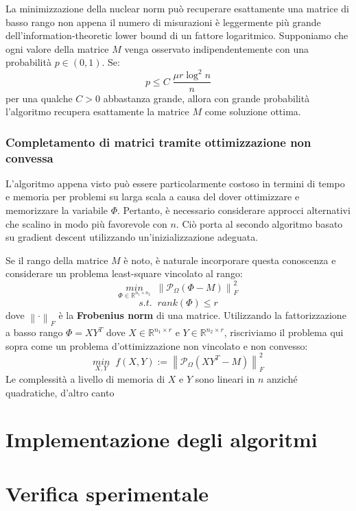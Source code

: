 \documentclass[12pt,a4paper]{report}
\newcommand{\frobnorm}[1]{\left\lVert#1\right\rVert _F}
\begin{document}
La minimizzazione della nuclear norm può recuperare esattamente
una matrice di basso rango non appena il numero di misurazioni è leggermente più grande
dell'information-theoretic lower bound di un fattore logaritmico.
Supponiamo che ogni valore della matrice $M$ venga osservato indipendentemente
con una probabilità $p \in (0,1)$. Se:
$$ p \leq C \; \frac{\mu r \log^2 n}{n} $$
per una qualche $C>0$ abbastanza grande, allora con grande probabilità
l'algoritmo recupera esattamente 
la matrice $M$ come soluzione ottima.

\subsection{Completamento di matrici tramite ottimizzazione non convessa}

L'algoritmo appena visto può essere particolarmente costoso in termini di tempo e memoria
per problemi su larga scala a causa del dover ottimizzare e memorizzare la variabile $\Phi$.
Pertanto, è necessario considerare approcci alternativi che scalino in modo più favorevole con $n$.
Ciò porta al secondo algoritmo basato su gradient descent utilizzando un'inizializzazione adeguata.

Se il rango della matrice $M$ è noto, è naturale incorporare questa conoscenza 
e considerare un problema least-square vincolato al rango:
$$ \underset{\Phi \in \mathbb{R}^{n_1 \times n_2}}{min}\;\; \frobnorm{\mathcal{P}_{\Omega}(\Phi - M)}^2 $$
$$ s.t. \;\;  rank(\Phi) \leq r $$ 
dove $\frobnorm{\cdot}$ è la \textbf{Frobenius norm} di una matrice.
Utilizzando la fattorizzazione a basso rango $\Phi = XY^T$ dove $X \in \mathbb{R}^{n_1 \times r}$
e $Y \in \mathbb{R}^{n_2 \times r}$, riscriviamo il problema qui sopra come 
un problema d'ottimizzazione non vincolato e non convesso:
$$ \underset{X,Y}{min}\;\; \mathit{f}(X,Y) := \frobnorm{\mathcal{P}_{\Omega}(XY^T - M)}^2 $$
Le complessità a livello di memoria di $X$ e $Y$ sono lineari in $n$
anziché quadratiche, d'altro canto 

\chapter{Implementazione degli algoritmi}



\chapter{Verifica sperimentale}



\cleardoublepage{} %
\end{document}
